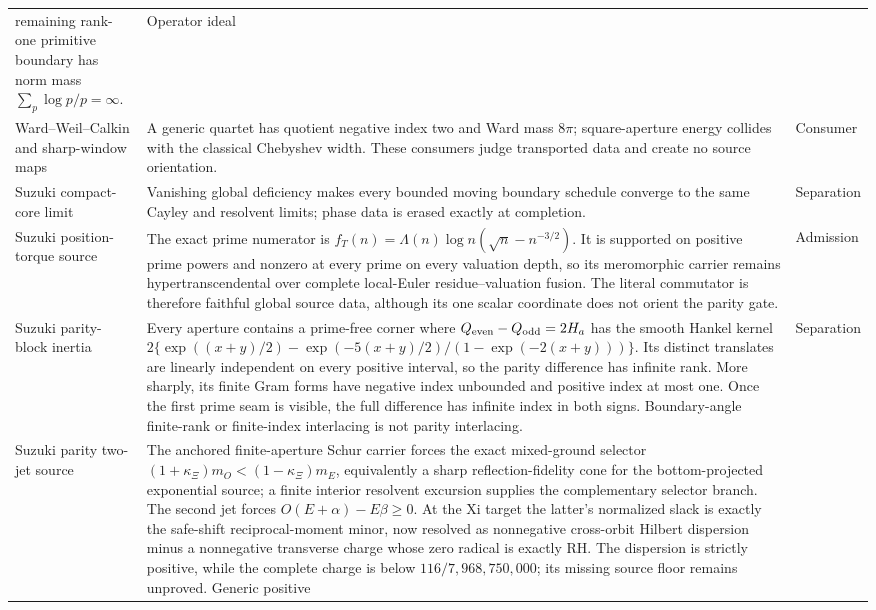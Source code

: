 \documentclass[11pt]{article}
\theoremstyle{definition}
\theoremstyle{remark}
\begin{document}
\begin{table}[ht]
\begin{tabular}{@{}>{\raggedright\arraybackslash}p{}
  >{\raggedright\arraybackslash}p{}
  >{\raggedright\arraybackslash}p{}@{}}
remaining rank-one primitive boundary has norm mass $\sum_p\log p/p=\infty$. & Operator ideal\\
Ward--Weil--Calkin and sharp-window maps & A generic quartet has quotient negative index two and
Ward mass $8\pi$; square-aperture energy collides with the classical Chebyshev width.  These
consumers judge transported data and create no source orientation. &
Consumer\\
Suzuki compact-core limit & Vanishing global deficiency makes every bounded moving boundary
schedule converge to the same Cayley and resolvent limits; phase data is erased exactly at
completion. & Separation\\
Suzuki position-torque source & The exact prime numerator is
$f_T(n)=\Lambda(n)\log n(\sqrt n-n^{-3/2})$.  It is supported on positive prime powers and
nonzero at every prime on every valuation depth, so its meromorphic carrier remains
hypertranscendental over complete local-Euler residue--valuation fusion.  The literal
commutator is therefore faithful global source data, although its one scalar coordinate does not
orient the parity gate. & Admission\\
Suzuki parity-block inertia & Every aperture contains a prime-free corner where
$Q_{\rm even}-Q_{\rm odd}=2H_a$ has the smooth Hankel kernel
$2\{\exp((x+y)/2)-\exp(-5(x+y)/2)/(1-\exp(-2(x+y)))\}$.
Its distinct translates are linearly independent on every positive interval, so the parity
difference has infinite rank.  More sharply, its finite Gram forms have negative index
unbounded and positive index at most one.  Once the first prime seam is visible, the full
difference has infinite index in both signs.  Boundary-angle finite-rank or finite-index
interlacing is not parity interlacing. &
Separation\\
Suzuki parity two-jet source & The anchored finite-aperture Schur carrier forces
the exact mixed-ground selector
$(1+\kappa_\Xi)m_O<(1-\kappa_\Xi)m_E$, equivalently a sharp reflection-fidelity
cone for the bottom-projected exponential source; a finite interior resolvent excursion supplies
the complementary selector branch.  The second jet forces
$O(E+\alpha)-E\beta\geq0$.  At the Xi target the latter's normalized slack is exactly the
safe-shift reciprocal-moment minor, now resolved as nonnegative cross-orbit Hilbert dispersion
minus a nonnegative transverse charge whose zero radical is exactly RH.  The dispersion is
strictly positive, while the complete charge is below
$116/7{,}968{,}750{,}000$; its missing source floor remains unproved.  Generic positive

\end{tabular}
\end{table}
\end{document}
